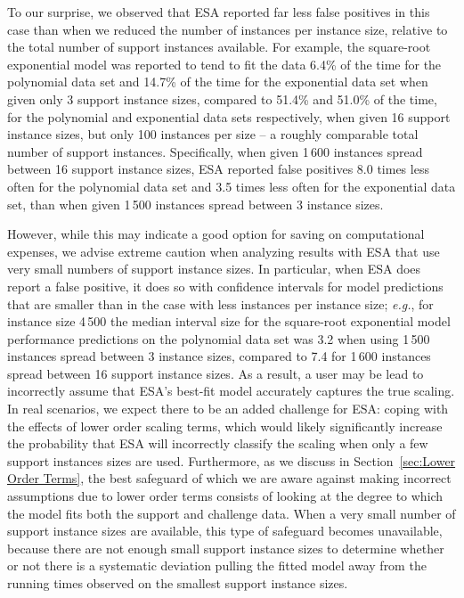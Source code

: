 \documentclass[aic]{iosart2x}
\newcommand{\eg}{\emph{e.g.}}
\begin{document}
To our surprise, we observed that ESA reported far less false positives in this case than when we reduced the number of instances per instance size, relative to the total number of support instances available. 
For example, the square-root exponential model was reported to tend to fit the data 6.4\% of the time for the polynomial data set and 14.7\% of the time for the exponential data set when given only 3 support instance sizes, compared to 51.4\% and 51.0\% of the time, for the polynomial and exponential data sets respectively, when given 16 support instance sizes, but only 100 instances per size -- a roughly comparable total number of support instances.
Specifically, when given 1\,600 instances spread between 16 support instance sizes, ESA reported false positives 8.0 times less often for the polynomial data set and 3.5 times less often for the exponential data set, than when given 1\,500 instances spread between 3 instance sizes. 

However, while this may indicate a good option for saving on computational expenses, we advise extreme caution when analyzing results with ESA that use very small numbers of support instance sizes. 
In particular, when ESA does report a false positive, it does so with confidence intervals for model predictions that are smaller than in the case with less instances per instance size; \eg{}, for instance size 4\,500 the median interval size for the square-root exponential model performance predictions on the polynomial data set was 3.2 when using 1\,500 instances spread between 3 instance sizes, compared to 7.4 for 1\,600 instances spread between 16 support instance sizes. 
As a result, a user may be lead to incorrectly assume that ESA's best-fit model accurately captures the true scaling. 
In real scenarios, we expect there to be an added challenge for ESA: coping with the effects of lower order scaling terms, which would likely significantly increase the probability that ESA will incorrectly classify the scaling when only a few support instances sizes are used. 
Furthermore, as we discuss in Section~\ref{sec:Lower Order Terms}, the best safeguard of which we are aware against making incorrect assumptions due to lower order terms consists of looking at the degree to which the model fits both the support and challenge data. When a very small number of support instance sizes are available, this type of safeguard becomes unavailable, because there are not enough small support instance sizes to determine whether or not there is a systematic deviation pulling the fitted model away from the running times observed on the smallest support instance sizes.
\end{document}
